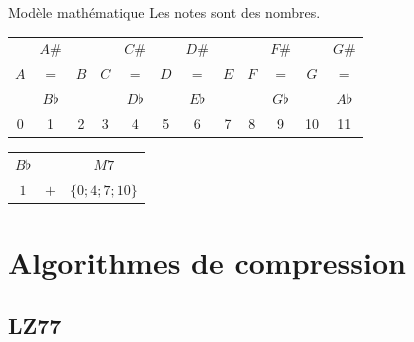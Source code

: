 \documentclass[10pt]{beamer}
\begin{document}
\begin{frame}{Modèle mathématique}
Les notes sont des nombres. \bigskip \pause

\begin{tabular}{|c|c|c|c|c|c|c|c|c|c|c|c|}
\hline
&$A\#$&&&$C\#$&&$D\#$&&&$F\#$&&$G\#$ \\
$A$&$=$&$B$&$C$&$=$&$D$&$=$&$E$&$F$&$=$&$G$&$=$ \\
&$B\flat$&&&$D\flat$&&$E\flat$&&&$G\flat$&&$A\flat$ \\ \hline
0&1&2&3&4&5&6&7&8&9&10&11 \\ \hline
\end{tabular} \bigskip \pause

\begin{center}
\LARGE\begin{tabular}{ccc}
$B\flat$ & & $M7$ \uncover<4>{\\
$1$ & $+$ & $\{0;4;7;10\}$}
\end{tabular}
\end{center}
\end{frame}

\section{Algorithmes de compression}

\subsection{LZ77}
\end{document}
